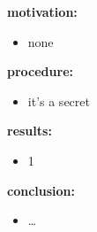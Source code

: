\begin{frame}{\expviii}
	\textbf{motivation:}
	\begin{itemize}
		\item none
	\end{itemize}
	\textbf{procedure:}
	\begin{itemize}
		\item it's a secret
	\end{itemize}
	\textbf{results:}
	\begin{itemize}
		\item 1
	\end{itemize}
	\textbf{conclusion:}
	\begin{itemize}
		\item \dots
	\end{itemize}
\end{frame}